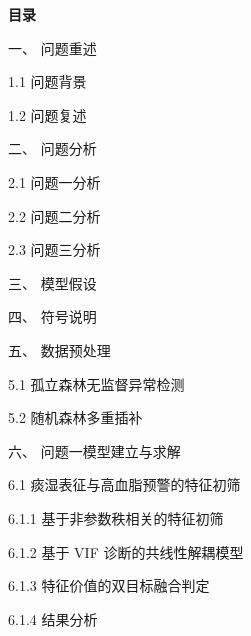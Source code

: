 \documentclass[12pt]{article}
\begin{document}
	\begin{center}
		\songti{}\textbf{目录}
	\end{center}
	\vspace{0.5em}
	
	{\songti{}
		\renewcommand{\baselinestretch}{1.35}\selectfont %
		
		\noindent 一、 问题重述  \par
		\noindent \hspace*{2em} 1.1 问题背景  \par
		\noindent \hspace*{2em} 1.2 问题复述  \par
		
		\noindent 二、 问题分析  \par
		\noindent \hspace*{2em} 2.1 问题一分析  \par
		\noindent \hspace*{2em} 2.2 问题二分析  \par
		\noindent \hspace*{2em} 2.3 问题三分析  \par
		
		\noindent 三、 模型假设  \par
		
		\noindent 四、 符号说明  \par
		
		\noindent 五、 数据预处理  \par
		\noindent \hspace*{2em} 5.1 孤立森林无监督异常检测  \par
		\noindent \hspace*{2em} 5.2 随机森林多重插补  \par
		
		\noindent 六、 问题一模型建立与求解  \par
		\noindent \hspace*{2em} 6.1 痰湿表征与高血脂预警的特征初筛  \par
		\noindent \hspace*{4em} 6.1.1 基于非参数秩相关的特征初筛  \par
		\noindent \hspace*{4em} 6.1.2 基于 VIF 诊断的共线性解耦模型  \par
		\noindent \hspace*{4em} 6.1.3 特征价值的双目标融合判定  \par
		\noindent \hspace*{4em} 6.1.4 结果分析  \par
		
}
\end{document}
